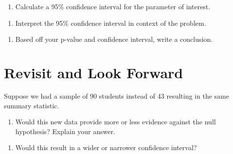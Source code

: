 \documentclass[
]{report}
\providecommand{\tightlist}{%
  \setlength{\itemsep}{0pt}\setlength{\parskip}{0pt}}
\begin{document}
\vspace{1in}

\begin{enumerate}
\def\labelenumi{\arabic{enumi}.}
\setcounter{enumi}{15}
\tightlist
\item
  Calculate a 95\% confidence interval for the parameter of interest.
\end{enumerate}

\vspace{1in}

\begin{enumerate}
\def\labelenumi{\arabic{enumi}.}
\setcounter{enumi}{16}
\tightlist
\item
  Interpret the 95\% confidence interval in context of the problem.
\end{enumerate}

\vspace{1in}

\begin{enumerate}
\def\labelenumi{\arabic{enumi}.}
\setcounter{enumi}{17}
\tightlist
\item
  Based off your p-value and confidence interval, write a conclusion.
\end{enumerate}

\vspace{1in}

\hypertarget{revisit-and-look-forward}{%
\section{Revisit and Look Forward}\label{revisit-and-look-forward}}

Suppose we had a sample of 90 students instead of 43 resulting in the same summary statistic.

\begin{enumerate}
\def\labelenumi{\arabic{enumi}.}
\setcounter{enumi}{18}
\tightlist
\item
  Would this new data provide more or less evidence against the null hypothesis? Explain your answer.
\end{enumerate}

\vspace{1in}

\begin{enumerate}
\def\labelenumi{\arabic{enumi}.}
\setcounter{enumi}{19}
\tightlist
\item
  Would this result in a wider or narrower confidence interval?
\end{enumerate}

\vspace{1in}
\end{document}
